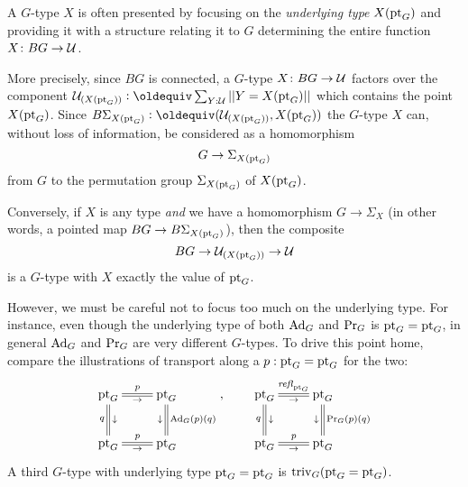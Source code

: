 \begin{remark}
  \label{remark:GsetsareGsets}
  A $G$-type $X$ is often presented by focusing on the \emph{underlying type} $X({\mathord{\mathrm{pt}}}_G)$  and providing it with a structure relating it to $G$ determining the entire function $X\colon BG\to\mathcal{U}$.

More precisely, since $BG$ is connected, a $G$-type $X\colon BG\to\mathcal{U}$ factors over the component $\UU_{(X(\pt_G))}\defequi\sum_{Y:\UU}||Y=X(\pt_G)||$ which contains the point $X({\mathord{\mathrm{pt}}}_G)$.  Since $B\Sigma_{X(\pt_G)}\defequi(\UU_{(X(\pt_G))},X(\pt_G))$ the $G$-type $X$ can, without loss of information, be considered as a homomorphism 
$$G\to\Sigma_{X(\pt_G)}%
$$ from $G$ to the permutation group $\Sigma_{X({\mathord{\mathrm{pt}}}_G)}$ of $X({\mathord{\mathrm{pt}}}_G)$.

Conversely, if $X$ is any type \emph{and} we have a homomorphism $G\to\Sigma_X$ (in other words, a pointed map $BG\to B\Sigma_{X(\pt_G)}%
$), then the composite
$$BG\to \mathcal{U}_{(X({\mathord{\mathrm{pt}}}_G))}\to \mathcal{U}$$
is a $G$-type with $X$ exactly the value of ${\mathord{\mathrm{pt}}}_G$.

However, we must be careful not to focus too much on the underlying type.  
For instance, even though the underlying type of both $\mathrm{Ad}_G$ and $\mathrm{Pr}_{{G}}$ is ${\mathord{\mathrm{pt}}}_G={\mathord{\mathrm{pt}}}_G$, in general  $\mathrm{Ad}_G$ and $\mathrm{Pr}_{{G}}$  are very different $G$-types.  
To drive this point home, compare the illustrations of transport along a $p:{\mathord{\mathrm{pt}}}_G={\mathord{\mathrm{pt}}}_G$ for the two:
$$\xymatrix{\pt_G\ar@{=}[r]^p_\to\ar@{=}[d]_q^\downarrow&\pt_G\ar@{=}[d]^{\Ad_G(p)(q)}_\downarrow\\
\pt_G\ar@{=}[r]^p_\to&\pt_G},\qquad
\xymatrix{\pt_G\ar@{=}[r]^{\refl{\pt_G}}_\to\ar@{=}[d]_q^\downarrow&\pt_G\ar@{=}[d]^{\princ G(p)(q)}_\downarrow\\
\pt_G\ar@{=}[r]^p_\to&\pt_G}$$
A third $G$-type with underlying type ${\mathord{\mathrm{pt}}}_G={\mathord{\mathrm{pt}}}_G$ is $\mathrm{triv}_G({\mathord{\mathrm{pt}}}_G={\mathord{\mathrm{pt}}}_G)$.
\end{remark}

